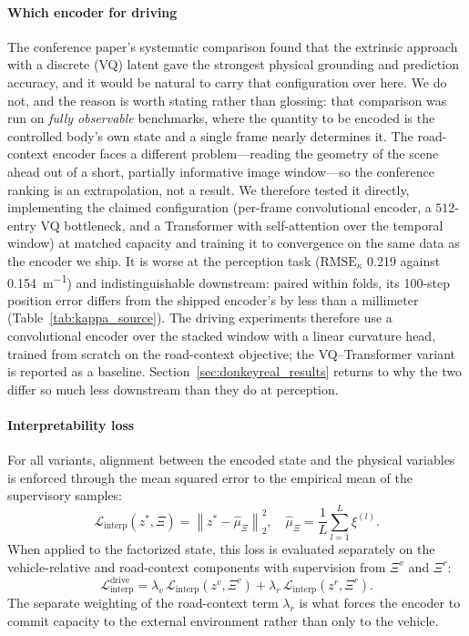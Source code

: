 \documentclass[preprint,12pt]{elsarticle}
\newcommand{\zv}{z^{v}}      %
\newcommand{\zr}{z^{r}}      %
\newcommand{\zstar}{z^{*}}   %
\begin{document}
\paragraph{Which encoder for driving}
The conference paper's systematic comparison found that the extrinsic approach
with a discrete (VQ) latent gave the strongest physical grounding and prediction
accuracy, and it would be natural to carry that configuration over here.
We do not, and the reason is worth stating rather than glossing: that comparison
was run on \emph{fully observable} benchmarks, where the quantity to be encoded is
the controlled body's own state and a single frame nearly determines it.
The road-context encoder faces a different problem---reading the geometry of the
scene ahead out of a short, partially informative image window---so the conference
ranking is an extrapolation, not a result.
We therefore tested it directly, implementing the claimed configuration (per-frame
convolutional encoder, a $512$-entry VQ bottleneck, and a Transformer with
self-attention over the temporal window) at matched capacity and training it to
convergence on the same data as the encoder we ship.
It is worse at the perception task ($\mathrm{RMSE}_\kappa$ \SI{0.219}{} against
\SI{0.154}{m^{-1}}) and indistinguishable downstream: paired within folds, its
100-step position error differs from the shipped encoder's by less than a
millimeter (Table~\ref{tab:kappa_source}).
The driving experiments therefore use a convolutional encoder over the stacked
window with a linear curvature head, trained from scratch on the road-context
objective; the VQ--Transformer variant is reported as a baseline.
Section~\ref{sec:donkeyreal_results} returns to why the two differ so much less
downstream than they do at perception.

\paragraph{Interpretability loss}
For all variants, alignment between the encoded state and the physical variables
is enforced through the mean squared error to the empirical mean of the
supervisory samples:
\begin{equation}
    \mathcal{L}_{\mathrm{interp}}(\zstar, \Xi)
    = \left\| \zstar - \hat{\mu}_\Xi \right\|_2^2,
    \quad \hat{\mu}_\Xi = \frac{1}{L}\sum_{l=1}^L \xi^{(l)}.
    \label{eq:interp_loss}
\end{equation}
When applied to the factorized state, this loss is evaluated separately on the
vehicle-relative and road-context components with supervision from $\Xi^v$ and
$\Xi^r$:
\begin{equation}
    \mathcal{L}_{\mathrm{interp}}^{\mathrm{drive}} =
    \lambda_v\,\mathcal{L}_{\mathrm{interp}}(\zv, \Xi^v)
    + \lambda_r\,\mathcal{L}_{\mathrm{interp}}(\zr, \Xi^r).
    \label{eq:interp_loss_drive}
\end{equation}
The separate weighting of the road-context term $\lambda_r$ is what forces the
encoder to commit capacity to the external environment rather than only to the
vehicle.
\end{document}
